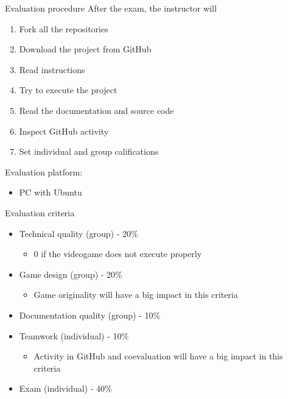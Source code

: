 \documentclass[10pt,compress]{beamer} %
\begin{document}
\begin{frame}{Evaluation procedure}
	After the exam, the instructor will
	\begin{enumerate}
	\item Fork all the repositories
	\item Download the project from GitHub
    \item Read instructions
	\item Try to execute the project
	\item Read the documentation and source code
	\item Inspect GitHub activity
	\item Set individual and group califications
	\end{enumerate}

	Evaluation platform:
	\begin{itemize}
	\item PC with Ubuntu
	\end{itemize}
\end{frame}

\begin{frame}{Evaluation criteria}
	\begin{itemize}	
	\item Technical quality (group) - 20\%
	    \begin{itemize}
	    \item $0$ if the videogame does not execute properly
	    \end{itemize}
	\item Game design (group) - 20\%
	    \begin{itemize}
	    \item Game originality will have a big impact in this criteria
	    \end{itemize}
	\item Documentation quality (group) - 10\%
	\item Teamwork (individual) - 10\%
	    \begin{itemize}
	    \item Activity in GitHub and coevaluation will have a big impact in this criteria
	    \end{itemize}
    \item Exam (individual) - 40\%
	\end{itemize}
\end{frame}
\end{document}
